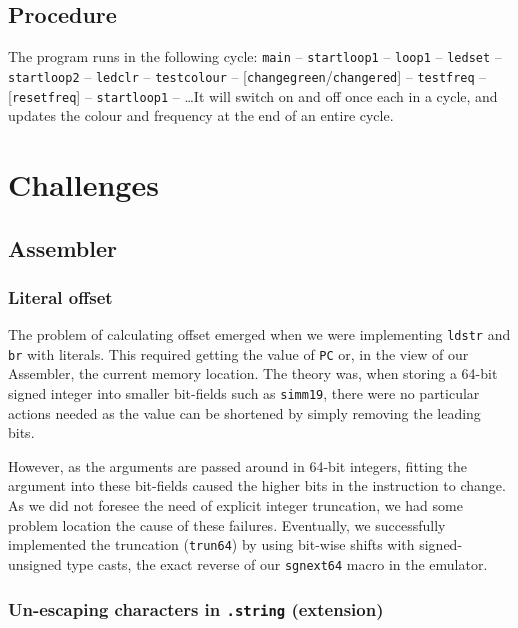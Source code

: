 \documentclass[11pt]{article}
\begin{document}
\subsection{Procedure}

The program runs in the following cycle: \texttt{main} -- \texttt{startloop1} -- \texttt{loop1} -- \texttt{ledset} -- \texttt{startloop2} -- \texttt{ledclr} -- \texttt{testcolour} -- [\texttt{changegreen}/\texttt{changered}] -- \texttt{testfreq} -- [\texttt{resetfreq}] -- \texttt{startloop1} -- \dots It will switch on and off once each in a cycle, and updates the colour and frequency at the end of an entire cycle.

\section{Challenges}

\subsection{Assembler}

\subsubsection{Literal offset}

The problem of calculating offset emerged when we were implementing \texttt{ldstr} and \texttt{br} with literals. This required getting the value of \texttt{PC} or, in the view of our Assembler, the current memory location. The theory was, when storing a 64-bit signed integer into smaller bit-fields such as \texttt{simm19}, there were no particular actions needed as the value can be shortened by simply removing the leading bits.

However, as the arguments are passed around in 64-bit integers, fitting the argument into these bit-fields caused the higher bits in the instruction to change. As we did not foresee the need of explicit integer truncation, we had some problem location the cause of these failures. Eventually, we successfully implemented the truncation (\texttt{trun64}) by using bit-wise shifts with signed-unsigned type casts, the exact reverse of our \texttt{sgnext64} macro in the emulator.

\subsubsection{Un-escaping characters in \texttt{.string} (extension)}
\end{document}
